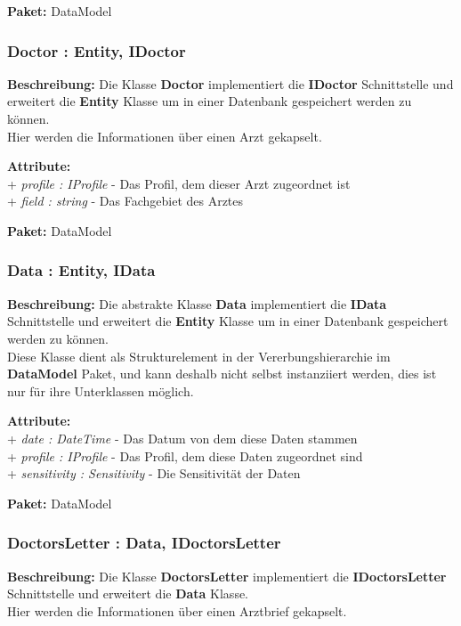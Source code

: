 \documentclass[a4paper]{scrreprt}
\begin{document}
\textbf{Paket:} DataModel

\subsubsection{Doctor : Entity, IDoctor}
\textbf{Beschreibung:} Die Klasse \textbf{Doctor} implementiert die \textbf{IDoctor} Schnittstelle und erweitert die \textbf{Entity} Klasse um in einer Datenbank gespeichert werden zu können.\\
Hier werden die Informationen über einen Arzt gekapselt.

\textbf{Attribute:}\\ 
+ \textit{profile : IProfile} - Das Profil, dem dieser Arzt zugeordnet ist\\
+ \textit{field : string} - Das Fachgebiet des Arztes

\textbf{Paket:} DataModel

\subsubsection{Data : Entity, IData}
\textbf{Beschreibung:} Die abstrakte Klasse \textbf{Data} implementiert die \textbf{IData} Schnittstelle und erweitert die \textbf{Entity} Klasse um in einer Datenbank gespeichert werden zu können.\\
Diese Klasse dient als Strukturelement in der Vererbungshierarchie im \textbf{DataModel} Paket, und kann deshalb nicht selbst instanziiert werden, dies ist nur für ihre Unterklassen möglich.

\textbf{Attribute:}\\
+ \textit{date : DateTime} - Das Datum von dem diese Daten stammen\\
+ \textit{profile : IProfile} - Das Profil, dem diese Daten zugeordnet sind\\
+ \textit{sensitivity : Sensitivity} - Die Sensitivität der Daten

\textbf{Paket:} DataModel

\subsubsection{DoctorsLetter : Data, IDoctorsLetter}
\textbf{Beschreibung:} Die Klasse \textbf{DoctorsLetter} implementiert die \textbf{IDoctorsLetter} Schnittstelle und erweitert die \textbf{Data} Klasse.\\
Hier werden die Informationen über einen  Arztbrief gekapselt.
\end{document}
